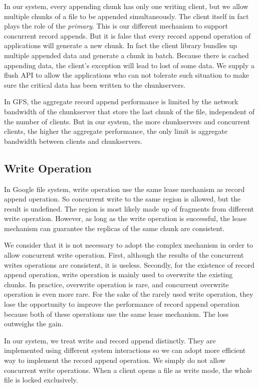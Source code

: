 \documentclass[letterpaper,twocolumn,10pt]{article}
\begin{document}
In our system, every appending chunk has only one writing client, but we allow multiple chunks of a file to be appended simultaneously. The client itself in fact plays the role of the \emph{primary}. This is our different mechanism to support concurrent record appends. But it is false that every record append operation of applications will generate a new chunk. In fact the client library bundles up multiple appended data and generate a chunk in batch. Because there is cached appending data, the client's exception will lead to lost of some data. We supply a flush API to allow the applications who can not tolerate such situation to make sure the critical data has been written to the chunkservers.

In GFS, the aggregate record append performance is limited by the network bandwidth of the chunkserver that store the last chunk of the file, independent of the number of clients. But in our system, the more chunkservers and concurrent clients, the higher the aggregate performance, the only limit is aggregate bandwidth between clients and chunkservers. 
\subsection{Write Operation}
In Google file system, write operation use the same lease mechanism as record append operation. So concurrent write to the same region is allowed, but the result is undefined. The region is most likely made up of fragments from different write operation. However, as long as the write operation is successful, the lease mechanism can guarantee the replicas of the same chunk are consistent. 

We consider that it is not necessary to adopt the complex mechanism in order to allow concurrent write operation. First, although the results of the concurrent writes operations are consistent, it is useless. Secondly, for the existence of record append operation, write operation is mainly used to overwrite the existing chunks. In practice, overwrite operation is rare, and concurrent overwrite operation is even more rare. For the sake of the rarely used write operation, they lose the opportunity to improve the performance of record append operation because both of these operations use the same lease mechanism. The loss outweighs the gain. 

In our system, we treat write and record append distinctly. They are implemented using different system interactions so we can adopt more efficient way to implement the record append operation. We simply do not allow concurrent write operations. When a client opens a file as write mode, the whole file is locked exclusively. 
\end{document}
